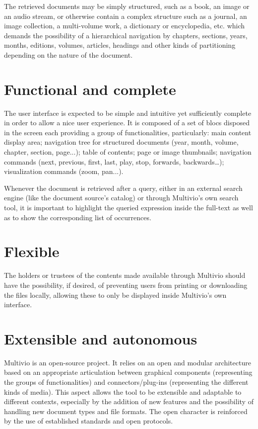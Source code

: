 \documentclass [a4paper]{article}
\begin{document}
The retrieved documents may be simply structured, such as a book, an image or
an audio stream, or otherwise contain a complex structure such as a journal, an
image collection, a multi-volume work, a dictionary or encyclopedia, etc. which
demands the possibility of a hierarchical navigation by chapters, sections,
years, months, editions, volumes, articles, headings and other kinds of
partitioning depending on the nature of the document.

\section{Functional and complete}

The user interface is expected to be simple and intuitive yet sufficiently
complete in order to allow a nice user experience. It is composed of a set of
blocs disposed in the screen each providing a group of functionalities,
particularly: main content display area; navigation tree for structured
documents (year, month, volume, chapter, section, page...); table of contents;
page or image thumbnails; navigation commands (next, previous, first, last,
play, stop, forwards, backwards…); visualization commands (zoom, pan...).

Whenever the document is retrieved after a query, either in an external search
engine (like the document source's catalog) or through Multivio's own search
tool, it is important to highlight the queried expression inside the full-text
as well as to show the corresponding list of occurrences.

\section{Flexible}

The holders or trustees of the contents made available through Multivio should
have the possibility, if desired, of preventing users from printing or
downloading the files locally, allowing these to only be displayed inside
Multivio's own interface.

\section{Extensible and autonomous}

Multivio is an open-source project. It relies on an open and modular
architecture based on an appropriate articulation between graphical components
(representing the groups of functionalities) and connectors/plug-ins
(representing the different kinds of media). This aspect allows the tool to be
extensible and adaptable to different contexts, especially by the addition of
new features and the possibility of handling new document types and file
formats. The open character is reinforced by the use of established standards
and open protocols.
\end{document}
